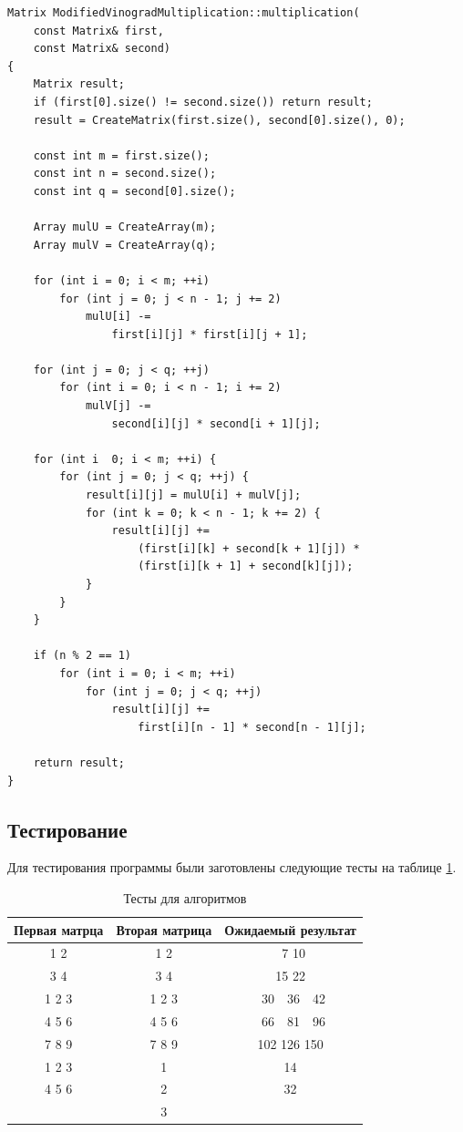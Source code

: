 \documentclass[a4paper,12pt]{article}
\begin{document}
\begin{lstlisting}[caption=Оптимизированный алгоритм Винограда умножения матриц]
Matrix ModifiedVinogradMultiplication::multiplication(
    const Matrix& first,
    const Matrix& second)
{
    Matrix result;
    if (first[0].size() != second.size()) return result;
    result = CreateMatrix(first.size(), second[0].size(), 0);

    const int m = first.size();
    const int n = second.size();
    const int q = second[0].size();

    Array mulU = CreateArray(m);
    Array mulV = CreateArray(q);

    for (int i = 0; i < m; ++i)
        for (int j = 0; j < n - 1; j += 2)
            mulU[i] -=
                first[i][j] * first[i][j + 1];

    for (int j = 0; j < q; ++j)
        for (int i = 0; i < n - 1; i += 2)
            mulV[j] -=
                second[i][j] * second[i + 1][j];

    for (int i  0; i < m; ++i) {
        for (int j = 0; j < q; ++j) {
            result[i][j] = mulU[i] + mulV[j];
            for (int k = 0; k < n - 1; k += 2) {
                result[i][j] +=
                    (first[i][k] + second[k + 1][j]) *
                    (first[i][k + 1] + second[k][j]);
            }
        }
    }

    if (n % 2 == 1)
        for (int i = 0; i < m; ++i)
            for (int j = 0; j < q; ++j)
                result[i][j] +=
                    first[i][n - 1] * second[n - 1][j];

    return result;
}
\end{lstlisting}

\subsection{Тестирование}

Для тестирования программы были заготовлены следующие тесты на таблице
\ref{table:test}.

\begin{table}[H]
    \caption{Тесты для алгоритмов}
    \label{table:test}
    \centering
    \begin{tabular}{|c|c|c|}
        \hline
        Первая матрца & Вторая матрица & Ожидаемый результат \\
        \hline
        1 2 & 1 2 & \ 7 10 \\
        3 4 & 3 4 & 15 22 \\
        \hline
        1 2 3 & 1 2 3 & \ 30\ \ 36\ \ 42 \\
        4 5 6 & 4 5 6 & \ 66\ \ 81\ \ 96 \\
        7 8 9 & 7 8 9 & 102 126 150 \\
        \hline
        1 2 3 & 1 & 14 \\
        4 5 6 & 2 & 32 \\
              & 3 & \\
        \hline
    \end{tabular}
\end{table}
\end{document}
